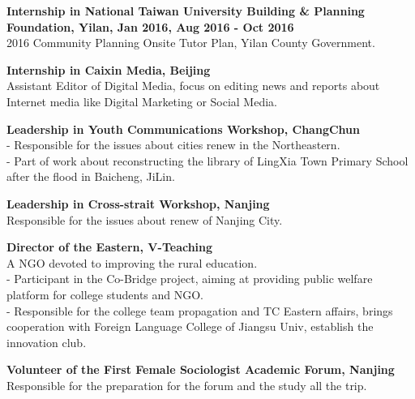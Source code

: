 \begin{cventries}
  \cventry
    {}
    {}
    {}
    {}
    {
      \begin{cvitems}           
        \item{\textbf{Internship in National Taiwan University Building \& Planning Foundation, Yilan, Jan 2016, Aug 2016 - Oct 2016} \\
         2016 Community Planning Onsite Tutor Plan, Yilan County Government.  }
        \item{\textbf{Internship in Caixin Media, Beijing}\\
         Assistant Editor of Digital Media, focus on editing news and reports about Internet media like Digital Marketing or Social Media.%
         }
        \item{\textbf{Leadership in Youth Communications Workshop, ChangChun}\\ %
        - Responsible for the issues about cities renew in the Northeastern. \\%
		- Part of work about reconstructing the library of LingXia Town Primary School after the flood in Baicheng, JiLin. %
          }  
        \item{\textbf{Leadership in Cross-strait Workshop, Nanjing}\\
         Responsible for the issues about renew of Nanjing City.%
         }
        \item{\textbf{Director of the Eastern, V-Teaching } \\ %
        A NGO devoted to improving the rural education. \\ %
        - Participant in the Co-Bridge project, aiming at providing public welfare platform for college students and NGO. \\ %
        - Responsible for the college team propagation and TC Eastern affairs, brings cooperation with Foreign Language College of Jiangsu Univ, establish the innovation club. }
        \item{\textbf{Volunteer of the First Female Sociologist Academic Forum, Nanjing}\\
         Responsible for the preparation for the forum and the study all the trip.}                                    
      \end{cvitems}
    }
        
\end{cventries}
